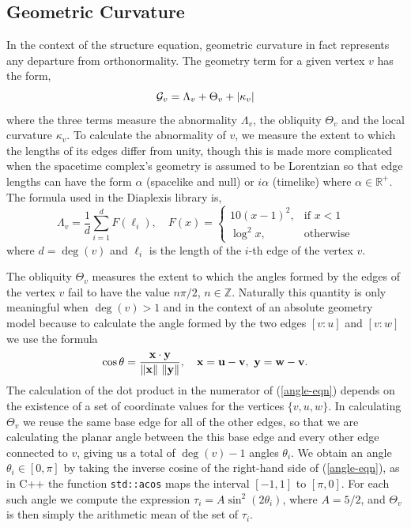 \documentclass[12pt,letterpaper]{report}
\begin{document}
\subsection{Geometric Curvature}

In the context of the structure equation, geometric curvature in fact represents any departure from 
orthonormality. The geometry term for a given vertex $v$ has the form,
\begin{equation}
{\cal G}_v = \Lambda_v + \Theta_v + \left\lvert\kappa_v\right\rvert  
\end{equation}
where the three terms measure the abnormality $\Lambda_v$, the obliquity $\Theta_v$ 
and the local curvature $\kappa_v$. To calculate the abnormality of $v$, we measure the extent to which 
the lengths of its edges differ from unity, though this is made more complicated when the spacetime 
complex's geometry is assumed to be Lorentzian so that edge lengths can have the form $\alpha$ (spacelike 
and null) or $i\alpha$ (timelike) where $\alpha\in\mathbb{R}^+$. The formula used in the Diaplexis library 
is,
\begin{equation*}
\Lambda_v = \frac {1}{d}\sum_{i=1}^d F(\ell_i), \quad F(x) = \begin{cases} 
                                                         10(x -1)^2,& \text{if } x < 1 \\
                                                         \log^2x,& \text{otherwise}
                                                              \end{cases}  
\end{equation*} 
where $d=\deg(v)$ and $\ell_i$ is the length of the $i$-th edge of the vertex $v$.

The obliquity $\Theta_v$ measures the extent to which the angles formed by the edges of the vertex $v$ 
fail to have the value $n\pi/2$, $n\in\mathbb{Z}$. Naturally this quantity is only meaningful when $\deg(v) > 1$ 
and in the context of an absolute geometry model because to calculate the angle formed by the two edges $[v:u]$ 
and $[v:w]$ we use the formula
\begin{equation}
\cos\theta = \frac {\mathbf{x}\cdot \mathbf{y}}{\left\lVert\mathbf{x}\right\rVert\, \left\lVert\mathbf{y}\right\rVert}, \quad \mathbf{x} = \mathbf{u} - \mathbf{v}, \,\, 
\mathbf{y} = \mathbf{w} - \mathbf{v}. \label{angle-eqn} 
\end{equation}
The calculation of the dot product in the numerator of (\ref{angle-eqn}) depends on the existence of a set of 
coordinate values for the vertices $\{v,u,w\}$. In calculating $\Theta_v$ we reuse the same base edge for all of 
the other edges, so that we are calculating the planar angle between the this base edge and every other edge 
connected to $v$, giving us a total of $\deg(v)-1$ angles $\theta_i$. We obtain an angle $\theta_i \in [0,\pi]$ 
by taking the inverse cosine of the right-hand side of (\ref{angle-eqn}), as in C++ the function \texttt{std::acos} 
maps the interval $[-1,1]$ to $[\pi,0]$. For each such angle we compute the expression $\tau_i = A\sin^2(2\theta_i)$, 
where $A=5/2$, and $\Theta_v$ is then simply the arithmetic mean of the set of $\tau_i$.   
\end{document}
